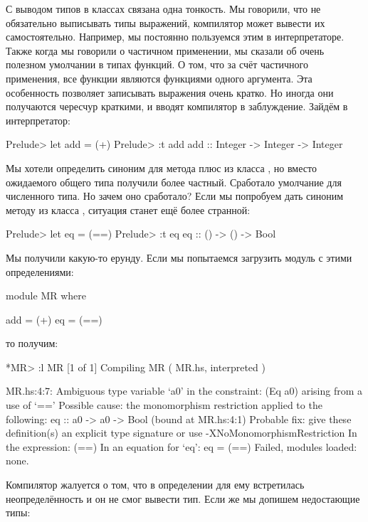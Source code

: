 С выводом типов в классах связана одна тонкость. Мы говорили, что не
обязательно выписывать типы выражений, компилятор может вывести их
самостоятельно. Например, мы постоянно пользуемся этим в интерпретаторе.
Также когда мы говорили о частичном применении, мы сказали об очень
полезном умолчании в типах функций. О том, что за счёт частичного
применения, все функции являются функциями одного аргумента. Эта
особенность позволяет записывать выражения очень кратко. Но иногда они
получаются чересчур краткими, и вводят компилятор в заблуждение. Зайдём
в интерпретатор:


\begin{code}
Prelude> let add = (+)
Prelude> :t add
add :: Integer -> Integer -> Integer
\end{code}

Мы хотели определить синоним для метода плюс из класса , но
вместо ожидаемого общего типа получили более частный. Сработало
умолчание для численного типа. Но зачем оно сработало? Если мы попробуем
дать синоним методу из класса , ситуация станет ещё более
странной:


\begin{code}
Prelude> let eq = (==)
Prelude> :t eq
eq :: () -> () -> Bool
\end{code}

Мы получили какую-то ерунду. Если мы попытаемся загрузить модуль с этими
определениями:


\begin{code}
module MR where

add = (+)
eq  = (==)
\end{code}

\noindent 

то получим:


\begin{code}
*MR> :l MR
[1 of 1] Compiling MR               ( MR.hs, interpreted )

MR.hs:4:7:
    Ambiguous type variable `a0' in the constraint:
      (Eq a0) arising from a use of `=='
    Possible cause: the monomorphism restriction applied to the following:
      eq :: a0 -> a0 -> Bool (bound at MR.hs:4:1)
    Probable fix: give these definition(s) an explicit type signature
                  or use -XNoMonomorphismRestriction
    In the expression: (==)
    In an equation for `eq': eq = (==)
Failed, modules loaded: none.
\end{code}

Компилятор жалуется о том, что в определении для  ему встретилась
неопределённость и он не смог вывести тип. Если же мы допишем
недостающие типы:


